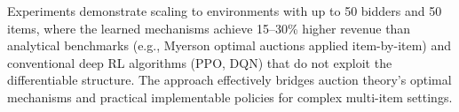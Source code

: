 Experiments demonstrate scaling to environments with up to 50 bidders and 50 items, where the learned mechanisms achieve 15--30\% higher revenue than analytical benchmarks (e.g., Myerson optimal auctions applied item-by-item) and conventional deep RL algorithms (PPO, DQN) that do not exploit the differentiable structure. The approach effectively bridges auction theory's optimal mechanisms and practical implementable policies for complex multi-item settings.
